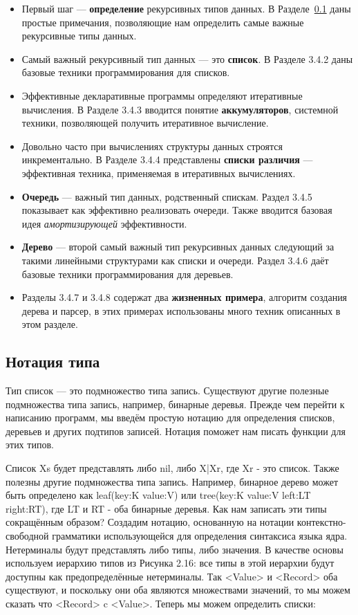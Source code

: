 \begin{itemize}
\item{Первый шаг --- \textbf{определение} рекурсивных типов данных. В Разделе~\ref{type_notation} даны простые примечания, позволяющие нам определить самые важные рекурсивные типы данных.}

\item{Самый важный рекурсивный тип данных --- это \textbf{список}. В Разделе 3.4.2 даны базовые техники программирования для списков.}

\item{Эффективные декларативные программы определяют итеративные вычисления. В Разделе 3.4.3 вводится понятие \textbf{аккумуляторов}, системной техники, позволяющей получить итеративное вычисление.}

\item{Довольно часто при вычислениях структуры данных строятся инкрементально. В Разделе 3.4.4 представлены \textbf{списки различия} --- эффективная техника, применяемая в итеративных вычислениях.}

\item{\textbf{Очередь} --- важный тип данных, родственный спискам. Раздел 3.4.5 показывает как эффективно реализовать очереди. Также вводится базовая идея \emph{амортизирующей} эффективности.}

\item{\textbf{Дерево} --- второй самый важный тип рекурсивных данных следующий за такими линейными структурами как списки и очереди. Раздел 3.4.6 даёт базовые техники программирования для деревьев.}

\item{Разделы 3.4.7 и 3.4.8 содержат два \textbf{жизненных примера}, алгоритм создания дерева и парсер, в этих примерах использованы много техник описанных в этом разделе.}
\end{itemize}

\subsection{Нотация типа}\label{type_notation}

Тип список --- это подмножество типа запись. Существуют другие полезные подмножества типа запись, например, бинарные деревья. Прежде чем перейти к написанию программ, мы введём простую нотацию для определения списков, деревьев и других подтипов записей. Нотация поможет нам писать функции для этих типов.

Список Xs будет представлять либо nil, либо X|Xr, где Xr - это список. Также полезны другие подмножества типа запись. Например, бинарное дерево может быть определено как leaf(key:K value:V) или tree(key:K value:V left:LT right:RT), где LT и RT - оба бинарные деревья. Как нам записать эти типы сокращённым образом? Создадим нотацию, основанную на нотации контекстно-свободной грамматики использующейся для определения синтаксиса языка ядра. Нетерминалы будут представлять либо типы, либо значения. В качестве основы используем иерархию типов из Рисунка 2.16: все типы в этой иерархии будут доступны как предопределённые нетерминалы. Так <Value> и <Record> оба существуют, и поскольку они оба являются множествами значений, то мы можем сказать что <Record> c <Value>. Теперь мы можем определить списки:

